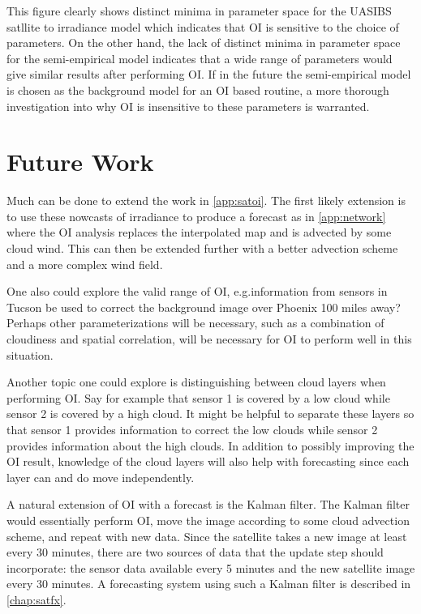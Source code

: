 This figure clearly shows distinct minima in parameter space for the
UASIBS satllite to irradiance model which indicates that  OI is
sensitive to the choice of parameters.
On the other hand, the lack of distinct minima in parameter space for
the semi-empirical model indicates that a wide range of parameters would
give similar results after performing OI.
If in the future the semi-empirical model is chosen as the background model
for an OI based routine, a more thorough investigation into why OI is
insensitive to these parameters is warranted.

\section{Future Work}
Much can be done to extend the work in \cref{app:satoi}.
The first likely extension is to use these nowcasts of irradiance to
produce a forecast as in \cref{app:network} where the OI analysis
replaces the interpolated map and is advected by some cloud wind.
This can then be extended further with a better advection scheme and
a more complex wind field.

One also could explore the valid range of OI, e.g.\@can information
from sensors in Tucson be used to correct the background image over
Phoenix 100 miles away?
Perhaps other parameterizations will be necessary, such as a
combination of cloudiness and spatial correlation, will be necessary
for OI to perform well in this situation.

Another topic one could explore is distinguishing between cloud layers
when performing OI.
Say for example that sensor 1 is covered by a low cloud while sensor 2
is covered by a high cloud.
It might be helpful to separate these layers so that sensor 1 provides
information to correct the low clouds while sensor 2 provides
information about the high clouds.
In addition to possibly improving the OI result, knowledge of the
cloud layers will also help with forecasting since each layer can and
do move independently.

A natural extension of OI with a forecast is the Kalman filter.
The Kalman filter would essentially perform OI, move the image
according to some cloud advection scheme, and repeat with new data.
Since the satellite takes a new image at least every 30 minutes, there
are two sources of data that the update step should incorporate: the
sensor data available every 5 minutes and the new satellite image
every 30 minutes.
A forecasting system using such a Kalman filter is described in
\cref{chap:satfx}.

